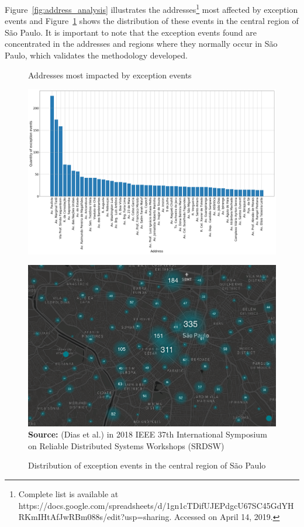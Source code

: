 \documentclass[runningheads]{llncs}
\begin{document}
Figure~\ref{fig:address_analysis} illustrates the addresses\footnote{Complete list is available at https://docs.google.com/spreadsheets/d/\newline1gn1cTDifUJEPdgcU67SC45GdYHRKmIHtAfJwRBm088s/edit?usp=sharing. Accessed on April 14, 2019.} most affected by exception events and Figure~\ref{fig:dispersion} shows the distribution of these events in the central region of São Paulo. It is important to note that the exception events found are concentrated in the addresses and regions where they normally occur in São Paulo, which validates the methodology developed.

\begin{figure}
\centering
\begin{minipage}{.5\textwidth}
  \centering
    \caption{Addresses most impacted by exception events}
    \includegraphics[width=1\linewidth]{address_analysis.png}
  \label{fig:address_analysis}
\end{minipage}%
\begin{minipage}{.5\textwidth}
  \centering
    \caption{Distribution of exception events in the central region of São Paulo}
    \includegraphics[width=1\linewidth]{exception_events_sp.png}
      \textbf{Source:} (Dias et al.) in 2018 IEEE 37th International Symposium on Reliable Distributed Systems Workshops (SRDSW)
  \label{fig:dispersion}
\end{minipage}
\end{figure}
\end{document}
